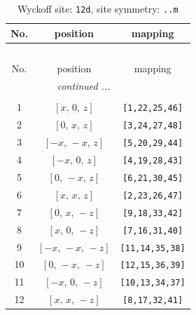 \documentclass[fleqn,8pt]{jsarticle}
\begin{document}
\renewcommand{\arraystretch}{1.2}
\begin{longtable}{ccc}
\caption{Wyckoff site: {\tt 12d}, site symmetry: {\tt ..m}}
 \\
 \hline \hline
No. & position & mapping \\ \hline \endfirsthead

\multicolumn{2}{l}{\tablename\ \thetable{}} \\
 \hline \hline
No. & position & mapping \\ \hline \endhead

 \hline \hline
\multicolumn{2}{r}{\footnotesize\it continued ...} \\ \endfoot

 \hline \hline
\multicolumn{2}{r}{} \\ \endlastfoot

1 & $\left[ x,\, 0,\, z \right]$ & {\tt [1,22,25,46]} \\ \hline
2 & $\left[ 0,\, x,\, z \right]$ & {\tt [3,24,27,48]} \\ \hline
3 & $\left[ - x,\, - x,\, z \right]$ & {\tt [5,20,29,44]} \\ \hline
4 & $\left[ - x,\, 0,\, z \right]$ & {\tt [4,19,28,43]} \\ \hline
5 & $\left[ 0,\, - x,\, z \right]$ & {\tt [6,21,30,45]} \\ \hline
6 & $\left[ x,\, x,\, z \right]$ & {\tt [2,23,26,47]} \\ \hline
7 & $\left[ 0,\, x,\, - z \right]$ & {\tt [9,18,33,42]} \\ \hline
8 & $\left[ x,\, 0,\, - z \right]$ & {\tt [7,16,31,40]} \\ \hline
9 & $\left[ - x,\, - x,\, - z \right]$ & {\tt [11,14,35,38]} \\ \hline
10 & $\left[ 0,\, - x,\, - z \right]$ & {\tt [12,15,36,39]} \\ \hline
11 & $\left[ - x,\, 0,\, - z \right]$ & {\tt [10,13,34,37]} \\ \hline
12 & $\left[ x,\, x,\, - z \right]$ & {\tt [8,17,32,41]} \\
\end{longtable}
\renewcommand{\arraystretch}{1.2}
\end{document}
